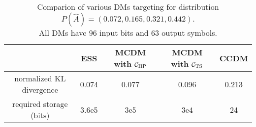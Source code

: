 \begin{table*}[t]
\caption{Comparion of various DMs targeting for distribution $P(\hat{A})=(0.072,0.165,0.321,0.442)$.\\ All DMs have 96 input bits and 63 output symbols.}
\centering
\label{tab: dm_comp}
\begin{tabular}{|c|c|c|c|c|}
\hline
 & ESS & MCDM with $\mathcal{C}_{\rm{HP}}$ & MCDM with $\mathcal{C}_{\rm{TS}}$ & CCDM   \\ \hline
normalized KL divergence & 0.074              & 0.077                                                           & 0.096                                                            & 0.213 \\ \hline
required storage (bits)  & 3.6e5               & 3e5                                                              & 3e4                                                               & 24     \\ \hline
\end{tabular}
\end{table*}